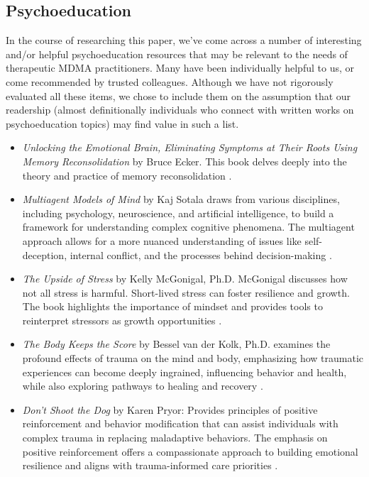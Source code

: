 \documentclass[12pt,letterpaper]{book}
\begin{document}
\subsection{Psychoeducation}
\label{sec:psychoeducation}
In the course of researching this paper, we've come across a number of interesting and/or helpful psychoeducation resources that may be relevant to the needs of therapeutic MDMA practitioners. Many have been individually helpful to us, or come recommended by trusted colleagues. Although we have not rigorously evaluated all these items, we chose to include them on the assumption that our readership (almost definitionally individuals who connect with written works on psychoeducation topics) may find value in such a list.
\label{resources}
\begin{itemize}
    \item \textit{Unlocking the Emotional Brain, Eliminating Symptoms at Their Roots Using Memory Reconsolidation} by Bruce Ecker. This book delves deeply into the theory and practice of memory reconsolidation \cite{eckerUnlocking}.
    \item \textit{Multiagent Models of Mind} by Kaj Sotala draws from various disciplines, including psychology, neuroscience, and artificial intelligence, to build a framework for understanding complex cognitive phenomena. The multiagent approach allows for a more nuanced understanding of issues like self-deception, internal conflict, and the processes behind decision-making \cite{sotalaMultiagent}.
    \item \textit{The Upside of Stress} by Kelly McGonigal, Ph.D. McGonigal discusses how not all stress is harmful. Short-lived stress can foster resilience and growth. The book highlights the importance of mindset and provides tools to reinterpret stressors as growth opportunities \cite{mcgonigalStress}.
    \item \textit{The Body Keeps the Score} by Bessel van der Kolk, Ph.D. examines the profound effects of trauma on the mind and body, emphasizing how traumatic experiences can become deeply ingrained, influencing behavior and health, while also exploring pathways to healing and recovery \cite{vanderKolkBody}. 
    \item \textit{Don't Shoot the Dog} by Karen Pryor: Provides principles of positive reinforcement and behavior modification that can assist individuals with complex trauma in replacing maladaptive behaviors. The emphasis on positive reinforcement offers a compassionate approach to building emotional resilience and aligns with trauma-informed care priorities \cite{pryorDog}.

\end{itemize}
\end{document}
